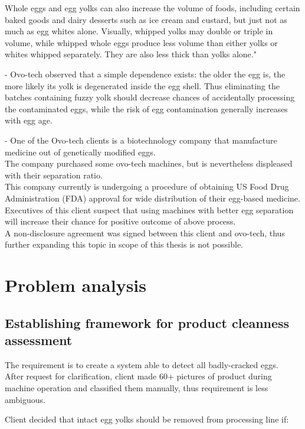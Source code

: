 \documentclass[12pt,twoside,a4paper]{article}
\begin{document}
Whole eggs and egg yolks can also increase the volume of foods, including certain baked goods and dairy desserts such as ice cream and custard, but just not as much as egg whites alone. Visually, whipped yolks may double or triple in volume, while whipped whole eggs produce less volume than either yolks or whites whipped separately. They are also less thick than yolks alone." \cite{eggprop}

- Ovo-tech observed that a simple dependence exists: the older the egg is, the more likely its yolk is degenerated inside the egg shell.
Thus eliminating the batches containing fuzzy yolk should decrease chances of accidentally processing the contaminated eggs, while the risk of egg contamination generally increases with egg age.

- One of the Ovo-tech clients is a biotechnology company that manufacture medicine out of genetically modified eggs.\\
The company purchased some ovo-tech machines, but is nevertheless displeased with their separation ratio.\\
This company currently is undergoing a procedure of obtaining US Food Drug Administration (FDA) approval for wide distribution of their egg-based medicine.\\
Executives of this client suspect that using machines with better egg separation will increase their chance for positive outcome of above process.\\
A non-disclosure agreement was signed between this client and ovo-tech, thus further expanding this topic in scope of this thesis is not possible.

\section{Problem analysis}
\subsection{Establishing framework for product cleanness assessment}

The requirement is to create a system able to detect all badly-cracked eggs.\\
After request for clarification, client made 60+ pictures of product during machine operation and classified them manually, thus requirement is less ambiguous.

Client decided that intact egg yolks should be removed from processing line if:
\end{document}
